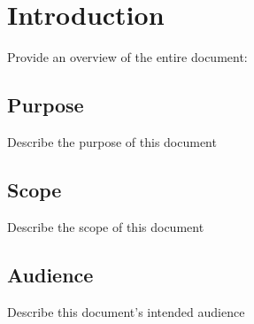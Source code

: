 \section{Introduction}
Provide an overview of the entire document:

\subsection{Purpose}
    Describe the purpose of this document
\subsection{Scope}
    Describe the scope of this document
\subsection{Audience}
    Describe this document's intended audience

